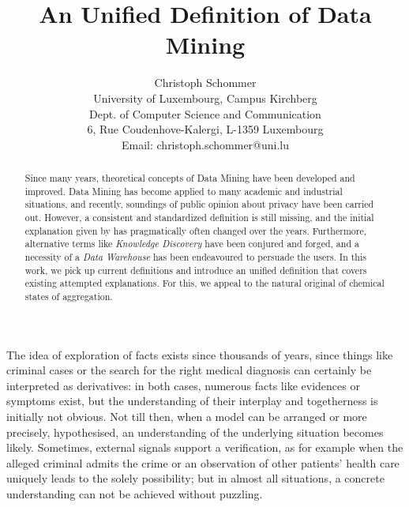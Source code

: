 \documentclass[10pt,latex8]{article}
\begin{document}
\title{An Unified Definition of Data Mining}
\author{Christoph Schommer\\
        University of Luxembourg, Campus Kirchberg\\
        Dept. of Computer Science and Communication\\
        6, Rue Coudenhove-Kalergi, L-1359 Luxembourg\\
        Email: christoph.schommer@uni.lu
}

\maketitle
\thispagestyle{empty}

\begin{abstract}
Since many years, theoretical concepts of Data Mining have been developed and improved. Data Mining has become applied to many academic and industrial situations, and recently, soundings of public opinion about privacy have been carried out. However, a consistent and standardized definition is still missing, and the initial explanation given by \cite{frawley} has pragmatically often changed over the years. Furthermore, alternative terms like \textit{Knowledge Discovery} have been conjured and forged, and a necessity of a \textit{Data Warehouse} has been endeavoured to persuade the users. In this work, we pick up current definitions and introduce an unified definition that covers existing attempted explanations. For this, we appeal to the natural original of chemical states of aggregation.
\end{abstract}



The idea of exploration of facts exists since thousands of years, since things like criminal cases or the search for the right medical diagnosis can certainly be interpreted as derivatives: in both cases, numerous facts like evidences or symptoms exist, but the understanding of their interplay and togetherness is initially not obvious. Not till then, when a model can be arranged or more precisely, hypothesised, an understanding of the underlying situation becomes likely. Sometimes, external signals support a verification, as for example when the alleged criminal admits the crime or an observation of other patients' health care uniquely leads to the solely possibility; but in almost all situations, a concrete understanding can not be achieved without puzzling. 
\end{document}
